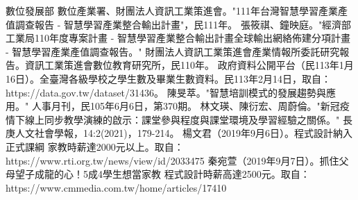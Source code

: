 \begin{thebibliography}{99}
   數位發展部 數位產業署、財團法人資訊工業策進會。"111年台灣智慧學習產業產值調查報告 - 智慧學習產業整合輸出計畫"，民111年。
   張筱祺、鐘映庭。"經濟部工業局110年度專案計畫 - 智慧學習產業整合輸出計畫全球輸出網絡佈建分項計畫 - 智慧學習產業產值調查報告。" 財團法人資訊工業策進會產業情報所委託研究報告。資訊工業策進會數位教育研究所，民110年。
   政府資料公開平台（民113年1月16日）。全臺灣各級學校之學生數及畢業生數資料。民113年2月14日，取自：https://data.gov.tw/dataset/31436。
   陳旻萃。"智慧培訓模式的發展趨勢與應用。" 人事月刊，民105年6月6日，第370期。
   林文瑛、陳衍宏、周蔚倫。"新冠疫情下線上同步教學演練的啟示：課堂參與程度與課堂環境及學習經驗之關係。" 長庚人文社會學報，14:2(2021)，179-214。
   楊文君（2019年9月6日）。程式設計納入正式課綱 家教時薪達2000元以上。取自：https://www.rti.org.tw/news/view/id/2033475
   秦宛萱（2019年9月7日）。抓住父母望子成龍的心！5成4學生想當家教 程式設計時薪高達2500元。取自：https://www.cmmedia.com.tw/home/articles/17410
\end{thebibliography} 